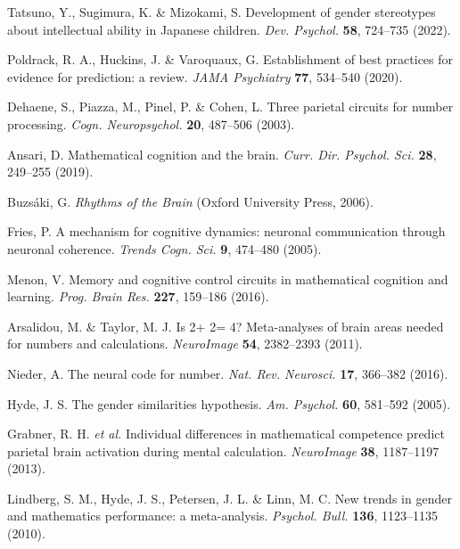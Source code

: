 \documentclass[pdflatex,sn-nature]{sn-jnl}%
\theoremstyle{thmstyleone}%
\theoremstyle{thmstyletwo}%
\theoremstyle{thmstylethree}%
\begin{document}
\begin{thebibliography}{99}
Tatsuno, Y., Sugimura, K. \& Mizokami, S. Development of gender stereotypes about intellectual ability in Japanese children. \textit{Dev. Psychol.} \textbf{58}, 724--735 (2022).

Poldrack, R. A., Huckins, J. \& Varoquaux, G. Establishment of best practices for evidence for prediction: a review. \textit{JAMA Psychiatry} \textbf{77}, 534--540 (2020).

Dehaene, S., Piazza, M., Pinel, P. \& Cohen, L. Three parietal circuits for number processing. \textit{Cogn. Neuropsychol.} \textbf{20}, 487--506 (2003).

Ansari, D. Mathematical cognition and the brain. \textit{Curr. Dir. Psychol. Sci.} \textbf{28}, 249--255 (2019).

Buzs\'{a}ki, G. \textit{Rhythms of the Brain} (Oxford University Press, 2006).

Fries, P. A mechanism for cognitive dynamics: neuronal communication through neuronal coherence. \textit{Trends Cogn. Sci.} \textbf{9}, 474--480 (2005).

Menon, V. Memory and cognitive control circuits in mathematical cognition and learning. \textit{Prog. Brain Res.} \textbf{227}, 159--186 (2016).

Arsalidou, M. \& Taylor, M. J. Is 2+ 2= 4? Meta-analyses of brain areas needed for numbers and calculations. \textit{NeuroImage} \textbf{54}, 2382--2393 (2011).

Nieder, A. The neural code for number. \textit{Nat. Rev. Neurosci.} \textbf{17}, 366--382 (2016).

Hyde, J. S. The gender similarities hypothesis. \textit{Am. Psychol.} \textbf{60}, 581--592 (2005).

Grabner, R. H. \textit{et al.} Individual differences in mathematical competence predict parietal brain activation during mental calculation. \textit{NeuroImage} \textbf{38}, 1187--1197 (2013).

Lindberg, S. M., Hyde, J. S., Petersen, J. L. \& Linn, M. C. New trends in gender and mathematics performance: a meta-analysis. \textit{Psychol. Bull.} \textbf{136}, 1123--1135 (2010).

\end{thebibliography}
\end{document}
